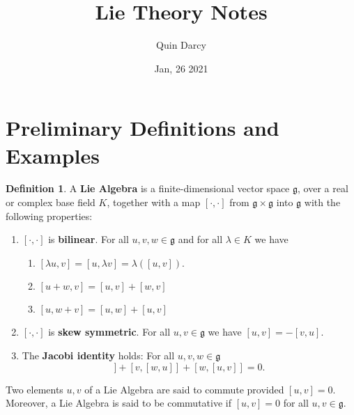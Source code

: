 \documentclass[12pt]{article}
\theoremstyle{definition}
\newtheorem{definition}{Definition}[section]
\theoremstyle{definition}
\begin{document}
\title{Lie Theory Notes}
\author{Quin Darcy}
\date{Jan, 26 2021}
\maketitle
    \section{Preliminary Definitions and Examples}
        \begin{definition}
            A \textbf{Lie Algebra} is a finite-dimensional vector space
            $\mathfrak{g}$, over
            a real or complex base field $K$,
            together with a map $[\cdot, \cdot]$ from
            $\mathfrak{g}\times\mathfrak{g}$ into $\mathfrak{g}$ with the
            following properties:
                \begin{enumerate}
                    \item $[\cdot, \cdot]$ is \textbf{bilinear}. For all $u, v, w\in\mathfrak{g}$ and for all
                        $\lambda\in K$ we have
                        \begin{enumerate}[label=(\roman*)]
                            \item $[\lambda u, v]=[u, \lambda
                                v]=\lambda([u, v])$.
                            \item $[u+w, v]=[u, v]+[w, v]$
                            \item $[u, w+v]=[u, w]+[u, v]$
                        \end{enumerate}
                    \item $[\cdot, \cdot]$ is \textbf{skew symmetric}. For all
                        $u, v\in\mathfrak{g}$ we have $[u, v]=-[v, u]$.
                    \item The \textbf{Jacobi identity} holds: For all
                        $u, v, w\in\mathfrak{g}$ 
                        \begin{equation*}
                            [u, [v, w]]+[v, [w, u]]+[w, [u, v]]=0.
                        \end{equation*}
                \end{enumerate}
            Two elements $u, v$ of a Lie Algebra are said to commute provided
            $[u, v]=0$. Moreover, a Lie Algebra is said to be commutative if
            $[u, v]=0$ for all $u, v\in\mathfrak{g}$.
        \end{definition}
\end{document}
